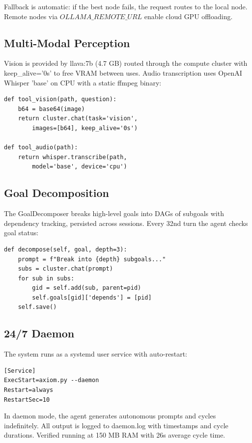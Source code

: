 \documentclass[11pt,a4paper]{article}
\begin{document}
Fallback is automatic: if the best node fails, the request routes to the
local node. Remote nodes via \(OLLAMA\_REMOTE\_URL\) enable cloud GPU
offloading.

\subsection{Multi-Modal Perception}

Vision is provided by llava:7b (4.7 GB) routed through the compute cluster
with keep\_alive='0s' to free VRAM between uses. Audio transcription uses
OpenAI Whisper 'base' on CPU with a static ffmpeg binary:

\begin{lstlisting}[caption={Multi-modal tools}]
def tool_vision(path, question):
    b64 = base64(image)
    return cluster.chat(task='vision',
        images=[b64], keep_alive='0s')

def tool_audio(path):
    return whisper.transcribe(path,
        model='base', device='cpu')
\end{lstlisting}

\subsection{Goal Decomposition}

The GoalDecomposer breaks high-level goals into DAGs of subgoals with
dependency tracking, persisted across sessions. Every 32nd turn the agent
checks goal status:

\begin{lstlisting}[caption={Goal decomposition}]
def decompose(self, goal, depth=3):
    prompt = f"Break into {depth} subgoals..."
    subs = cluster.chat(prompt)
    for sub in subs:
        gid = self.add(sub, parent=pid)
        self.goals[gid]['depends'] = [pid]
    self.save()
\end{lstlisting}

\subsection{24/7 Daemon}

The system runs as a systemd user service with auto-restart:

\begin{lstlisting}[caption={systemd service}]
[Service]
ExecStart=axiom.py --daemon
Restart=always
RestartSec=10
\end{lstlisting}

In daemon mode, the agent generates autonomous prompts and cycles
indefinitely. All output is logged to daemon.log with timestamps and cycle
durations. Verified running at 150 MB RAM with 26s average cycle time.
\end{document}
